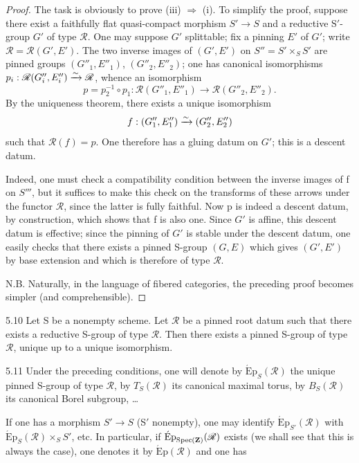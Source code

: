 \begin{proof}
The task is obviously to prove (iii) $\Rightarrow$ (i). To simplify the proof, suppose there exist a faithfully flat quasi-compact morphism $S'\to S$ and a reductive S$'$-group $G'$ of type $\mathscr R$. One may suppose $G'$ splittable; fix a pinning $E'$ of $G'$; write $\mathscr R=\mathscr R(G',E')$. The two inverse images of $(G',E')$ on $S''=S'\times_S S'$ are pinned groups $(G''_1,E''_1)$, $(G''_2,E''_2)$; one has canonical isomorphisms $p_i:\mathscr R(G''_i,E''_i)\xrightarrow{\sim}\mathscr R$, whence an isomorphism
\[
p=p_2^{-1}\circ p_1:\mathscr R(G''_1,E''_1)\to\mathscr R(G''_2,E''_2).
\]
By the uniqueness theorem, there exists a unique isomorphism
\[
f:(G''_1,E''_1)\xrightarrow{\sim}(G''_2,E''_2)
\]
such that $\mathscr R(f)=p$. One therefore has a gluing datum on $G'$; this is a descent datum.

Indeed, one must check a compatibility condition between the inverse images of f on $S'''$, but it suffices to make this check on the transforms of these arrows under the functor $\mathscr R$, since the latter is fully faithful. Now p is indeed a descent datum, by construction, which shows that f is also one. Since $G'$ is affine, this descent datum is effective; since the pinning of $G'$ is stable under the descent datum, one easily checks that there exists a pinned S-group $(G,E)$ which gives $(G',E')$ by base extension and which is therefore of type $\mathscr R$.

N.B. Naturally, in the language of fibered categories, the preceding proof becomes simpler (and comprehensible).
\end{proof}
\begin{corollary}{5.10}\label{XXIII.5.10}
Let S be a nonempty scheme. Let $\mathscr R$ be a pinned root datum such that there exists a reductive S-group of type $\mathscr R$. Then there exists a pinned S-group of type $\mathscr R$, unique up to a unique isomorphism.
\end{corollary}
\begin{definition}{5.11}\label{XXIII.5.11}
Under the preceding conditions, one will denote by $\mathrm{\acute Ep}_S(\mathscr R)$ the unique pinned S-group of type $\mathscr R$, by $T_S(\mathscr R)$ its canonical maximal torus, by $B_S(\mathscr R)$ its canonical Borel subgroup, \ldots
\end{definition}
If one has a morphism $S'\to S$ (S$'$ nonempty), one may identify $\mathrm{\acute Ep}_{S'}(\mathscr R)$ with $\mathrm{\acute Ep}_S(\mathscr R)\times_S S'$, etc. In particular, if $\mathrm{\acute Ep}_{\operatorname{Spec}(\mathbf{Z})}(\mathscr R)$ exists (we shall see that this is always the case), one denotes it by $\mathrm{\acute Ep}(\mathscr R)$ and one has
